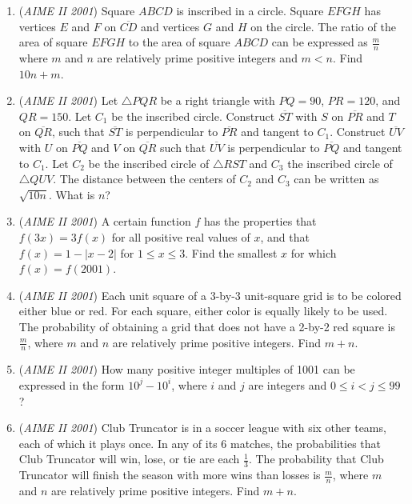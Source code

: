 \begin{enumerate}
 

	\item (\textit{AIME II 2001}) Square $ABCD$ is inscribed in a circle. Square $EFGH$ has vertices $E$ and $F$ on $\overline{CD}$ and vertices $G$ and $H$ on the circle. The ratio of the area of square $EFGH$ to the area of square $ABCD$ can be expressed as $\frac {m}{n}$ where $m$ and $n$ are relatively prime positive integers and $m < n$. Find $10n + m$.


 

	\item (\textit{AIME II 2001}) Let $\triangle{PQR}$ be a right triangle with $PQ = 90$, $PR = 120$, and $QR = 150$. Let $C_{1}$ be the inscribed circle. Construct $\overline{ST}$ with $S$ on $\overline{PR}$ and $T$ on $\overline{QR}$, such that $\overline{ST}$ is perpendicular to $\overline{PR}$ and tangent to $C_{1}$. Construct $\overline{UV}$ with $U$ on $\overline{PQ}$ and $V$ on $\overline{QR}$ such that $\overline{UV}$ is perpendicular to $\overline{PQ}$ and tangent to $C_{1}$. Let $C_{2}$ be the inscribed circle of $\triangle{RST}$ and $C_{3}$ the inscribed circle of $\triangle{QUV}$. The distance between the centers of $C_{2}$ and $C_{3}$ can be written as $\sqrt {10n}$. What is $n$?


 

	\item (\textit{AIME II 2001}) A certain function $f$ has the properties that $f(3x) = 3f(x)$ for all positive real values of $x$, and that $f(x) = 1 - |x - 2|$ for $1\leq x \leq 3$. Find the smallest $x$ for which $f(x) = f(2001)$.


 

	\item (\textit{AIME II 2001}) Each unit square of a 3-by-3 unit-square grid is to be colored either blue or red. For each square, either color is equally likely to be used. The probability of obtaining a grid that does not have a 2-by-2 red square is $\frac {m}{n}$, where $m$ and $n$ are relatively prime positive integers. Find $m + n$.


 

	\item (\textit{AIME II 2001}) How many positive integer multiples of 1001 can be expressed in the form $10^{j} - 10^{i}$, where $i$ and $j$ are integers and $0\leq i < j \leq 99$?


 

	\item (\textit{AIME II 2001}) Club Truncator is in a soccer league with six other teams, each of which it plays once. In any of its 6 matches, the probabilities that Club Truncator will win, lose, or tie are each $\frac {1}{3}$. The probability that Club Truncator will finish the season with more wins than losses is $\frac {m}{n}$, where $m$ and $n$ are relatively prime positive integers. Find $m + n$.



\end{enumerate}

